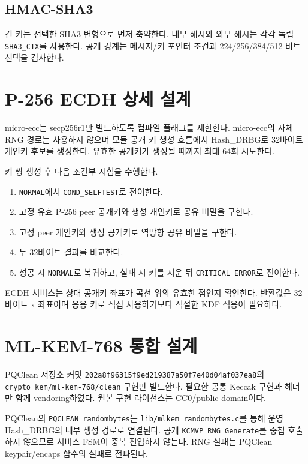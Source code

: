 \documentclass[11pt,a4paper]{article}
\begin{document}
\subsection{HMAC-SHA3}

긴 키는 선택한 SHA3 변형으로 먼저 축약한다. 내부 해시와 외부 해시는 각각
독립 \texttt{SHA3\_CTX}를 사용한다. 공개 경계는 메시지/키 포인터 조건과
224/256/384/512 비트 선택을 검사한다.

\section{P-256 ECDH 상세 설계}

micro-ecc는 secp256r1만 빌드하도록 컴파일 플래그를 제한한다. micro-ecc의
자체 RNG 경로는 사용하지 않으며 모듈 공개 키 생성 흐름에서 Hash\_DRBG로
32바이트 개인키 후보를 생성한다. 유효한 공개키가 생성될 때까지 최대 64회
시도한다.

키 쌍 생성 후 다음 조건부 시험을 수행한다.

\begin{enumerate}
  \item \texttt{NORMAL}에서 \texttt{COND\_SELFTEST}로 전이한다.
  \item 고정 유효 P-256 peer 공개키와 생성 개인키로 공유 비밀을 구한다.
  \item 고정 peer 개인키와 생성 공개키로 역방향 공유 비밀을 구한다.
  \item 두 32바이트 결과를 비교한다.
  \item 성공 시 \texttt{NORMAL}로 복귀하고, 실패 시 키를 지운 뒤
        \texttt{CRITICAL\_ERROR}로 전이한다.
\end{enumerate}

ECDH 서비스는 상대 공개키 좌표가 곡선 위의 유효한 점인지 확인한다. 반환값은
32바이트 x 좌표이며 응용 키로 직접 사용하기보다 적절한 KDF 적용이 필요하다.

\section{ML-KEM-768 통합 설계}

PQClean 저장소 커밋
\texttt{202a8f96315f9ed219387a50f7e40d04af037ea8}의
\texttt{crypto\_kem/ml-kem-768/clean} 구현만 빌드한다. 필요한 공통 Keccak
구현과 헤더만 함께 vendoring하였다. 원본 구현 라이선스는 CC0/public domain이다.

PQClean의 \texttt{PQCLEAN\_randombytes}는
\texttt{lib/mlkem\_randombytes.c}를 통해 운영 Hash\_DRBG의 내부 생성 경로로
연결된다. 공개 \texttt{KCMVP\_RNG\_Generate}를 중첩 호출하지 않으므로 서비스
FSM이 중복 진입하지 않는다. RNG 실패는 PQClean keypair/encaps 함수의 실패로
전파된다.
\end{document}
